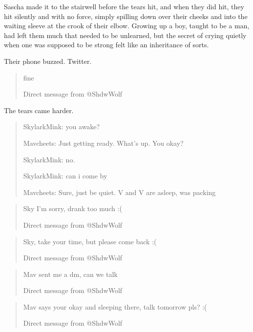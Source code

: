 \secdiv

Sascha made it to the stairwell before the tears hit, and when they did hit, they hit silently and with no force, simply spilling down over their cheeks and into the waiting sleeve at the crook of their elbow. Growing up a boy, taught to be a man, had left them much that needed to be unlearned, but the secret of crying quietly when one was supposed to be strong felt like an inheritance of sorts.

Their phone buzzed. Twitter.

\begin{quotation}
  fine

  Direct message from @ShdwWolf
\end{quotation}

The tears came harder.

\secdiv

\begin{quotation}
  SkylarkMink: you awake?

  Mavcheets: Just getting ready.  What's up.  You okay?

  SkylarkMink: no.

  SkylarkMink: can i come by

  Mavcheets: Sure, just be quiet. V and V are asleep, was packing
\end{quotation}

\secdiv

\begin{quotation}
  Sky I'm sorry, drank too much :(

  Direct message from @ShdwWolf
\end{quotation}

\secdiv

\begin{quotation}
  Sky, take your time, but please come back :(

  Direct message from @ShdwWolf
\end{quotation}

\secdiv

\begin{quotation}
  Mav sent me a dm, can we talk

  Direct message from @ShdwWolf
\end{quotation}

\secdiv

\begin{quotation}
  Mav says your okay and sleeping there, talk tomorrow pls? :(

  Direct message from @ShdwWolf
\end{quotation}


